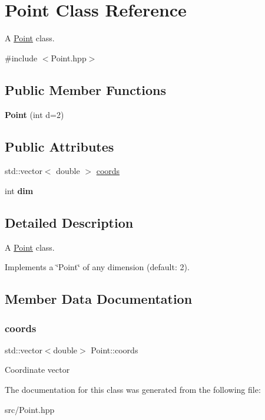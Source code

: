 \hypertarget{class_point}{}\section{Point Class Reference}
\label{class_point}


A \hyperlink{class_point}{Point} class.  




{\ttfamily \#include $<$Point.\+hpp$>$}

\subsection*{Public Member Functions}
\begin{DoxyCompactItemize}
\item 
\mbox{\label{class_point_a9cc79bc8d5bf1a8967f427376bede8b9}} 
{\bfseries Point} (int d=2)
\end{DoxyCompactItemize}
\subsection*{Public Attributes}
\begin{DoxyCompactItemize}
\item 
std\+::vector$<$ double $>$ \hyperlink{class_point_a465efb6efd0c3e0d9cd09e57e2fa230d}{coords}
\item 
\mbox{\label{class_point_ad506f1484a4c9a0ba5e1d40019584de9}} 
int {\bfseries dim}
\end{DoxyCompactItemize}


\subsection{Detailed Description}
A \hyperlink{class_point}{Point} class. 

Implements a \char`\"{}\+Point\char`\"{} of any dimension (default\+: 2). 

\subsection{Member Data Documentation}
\mbox{\label{class_point_a465efb6efd0c3e0d9cd09e57e2fa230d}} 
\subsubsection{\texorpdfstring{coords}{coords}}
{\footnotesize\ttfamily std\+::vector$<$double$>$ Point\+::coords}

Coordinate vector 

The documentation for this class was generated from the following file\+:\begin{DoxyCompactItemize}
\item 
src/Point.\+hpp\end{DoxyCompactItemize}
